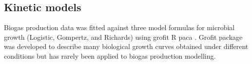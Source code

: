 \subsection{Kinetic models}
Biogas production data was fitted against three model formulas for microbial growth (Logistic, Gompertz, and Richards) using grofit R paca \cite{Kahm_2010}. Grofit package was developed to describe many biological growth curves obtained under different conditions but has rarely been applied to biogas production modelling. 